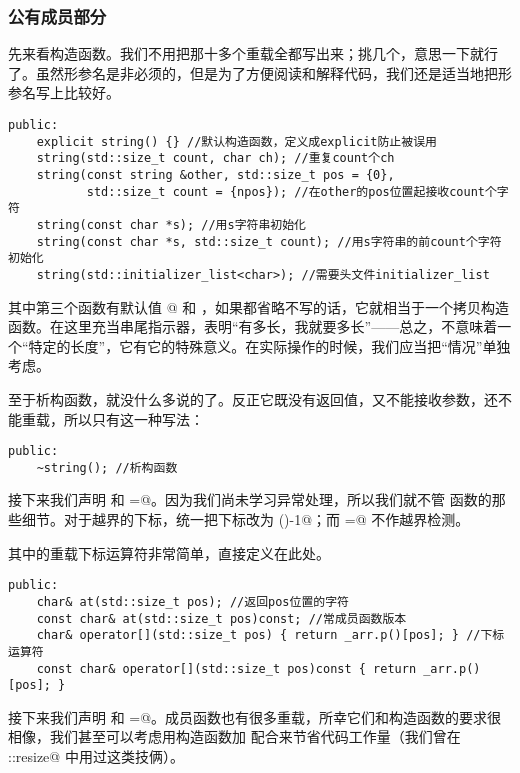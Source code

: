 \subsubsection*{公有成员部分}
先来看构造函数。我们不用把那十多个重载全都写出来；挑几个，意思一下就行了。虽然形参名是非必须的，但是为了方便阅读和解释代码，我们还是适当地把形参名写上比较好。
\begin{lstlisting}
public:
    explicit string() {} //默认构造函数，定义成explicit防止被误用
    string(std::size_t count, char ch); //重复count个ch
    string(const string &other, std::size_t pos = {0},
           std::size_t count = {npos}); //在other的pos位置起接收count个字符
    string(const char *s); //用s字符串初始化
    string(const char *s, std::size_t count); //用s字符串的前count个字符初始化
    string(std::initializer_list<char>); //需要头文件initializer_list
\end{lstlisting}
其中第三个函数有默认值 @ 和 \lstinline@npos@，如果都省略不写的话，它就相当于一个拷贝构造函数。\lstinline@npos@ 在这里充当串尾指示器，表明``\lstinline@other@ 有多长，我就要多长''——总之，\lstinline@npos@ 不意味着一个``特定的长度''，它有它的特殊意义。在实际操作的时候，我们应当把``\lstinline@pos@ 情况''单独考虑。\par
至于析构函数，就没什么多说的了。反正它既没有返回值，又不能接收参数，还不能重载，所以只有这一种写法：
\begin{lstlisting}
public:
    ~string(); //析构函数
\end{lstlisting}\par
接下来我们声明 \lstinline@at@ 和 \lstinline@operator=@。因为我们尚未学习异常处理，所以我们就不管 \lstinline@at@ 函数的那些细节。对于越界的下标，统一把下标改为 \lstinline@size()-1@；而 \lstinline@operator=@ 不作越界检测。\par
其中的重载下标运算符非常简单，直接定义在此处。\par
\begin{lstlisting}
public:
    char& at(std::size_t pos); //返回pos位置的字符
    const char& at(std::size_t pos)const; //常成员函数版本
    char& operator[](std::size_t pos) { return _arr.p()[pos]; } //下标运算符
    const char& operator[](std::size_t pos)const { return _arr.p()[pos]; }
\end{lstlisting}
接下来我们声明 \lstinline@assign@ 和 \lstinline@operator=@。\lstinline@assign@ 成员函数也有很多重载，所幸它们和构造函数的要求很相像，我们甚至可以考虑用构造函数加 \lstinline@swap@ 配合来节省代码工作量（我们曾在 \lstinline@valarri::resize@ 中用过这类技俩）。\par
